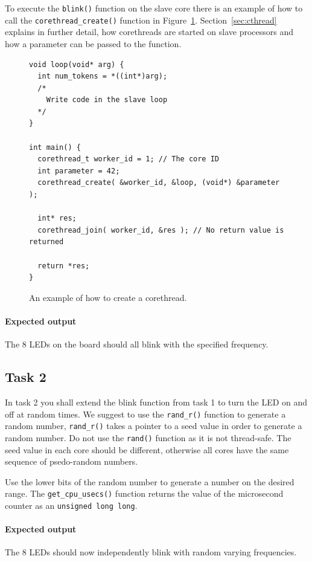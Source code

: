 \documentclass[a4paper,fontsize=10pt,twoside,DIV15,BCOR12mm,headinclude=true,footinclude=false,pagesize,bibtotoc]{scrbook}
\newcommand{\code}[1]{{\texttt{#1}}}
\begin{document}
To execute the \code{blink()} function on the slave core there is an example of
how to call the \code{corethread\_create()} function in Figure~\ref{fig:corethread}.
Section~\ref{sec:cthread} explains in further detail, how corethreads are started
on slave processors and how a parameter can be passed to the function.

\begin{figure}
\begin{Verbatim}[xleftmargin=1cm,xrightmargin=1cm,frame=single,framesep=3mm]
void loop(void* arg) {
  int num_tokens = *((int*)arg);
  /*
    Write code in the slave loop
  */
}

int main() {
  corethread_t worker_id = 1; // The core ID
  int parameter = 42;
  corethread_create( &worker_id, &loop, (void*) &parameter );  

  int* res;
  corethread_join( worker_id, &res ); // No return value is returned

  return *res;  
}
\end{Verbatim}
\caption{\label{fig:corethread}An example of how to create a corethread.}
\end{figure}

\paragraph*{Expected output}
The 8 LEDs on the board should all blink with the specified frequency.

\subsection{Task 2}
In task 2 you shall extend the blink function from task 1 to turn the LED on and off at random times.
We suggest to use the \code{rand\_r()} function to generate a random number,
\code{rand\_r()} takes a pointer to a seed value in order to generate a random number.
Do not use the \code{rand()} function as it is not thread-safe.
The seed value in each core should be different, otherwise all cores have the
same sequence of psedo-random numbers.

Use the lower bits of the random number to generate a number on the desired range.
The \code{get\_cpu\_usecs()} function returns the value of the microsecond counter as an \code{unsigned long long}. 

\paragraph*{Expected output}
The 8 LEDs should now independently blink with random varying frequencies.
\end{document}
